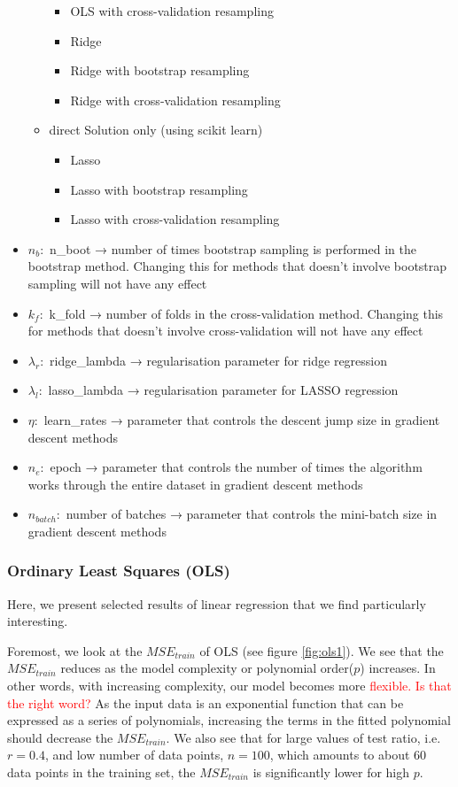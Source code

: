 \begin{itemize}
\begin{itemize}
\begin{itemize}
            \item OLS with cross-validation resampling
            \item Ridge
            \item Ridge with bootstrap resampling
            \item Ridge with cross-validation resampling
        \end{itemize}
        \item direct Solution only (using scikit learn)
        \begin{itemize}
            \item Lasso
            \item Lasso with bootstrap resampling
            \item Lasso with cross-validation resampling
        \end{itemize}
    \end{itemize}
    \item $n_b:$  n\_boot → number of times bootstrap sampling is performed in the bootstrap method. Changing this for methods that doesn't involve bootstrap sampling will not have any effect
    \item $k_f:$  k\_fold → number of folds in the cross-validation method. Changing this for methods that doesn't involve cross-validation will not have any effect
    \item $\lambda_r:$  ridge\_lambda → regularisation parameter for ridge regression
    \item $\lambda_l:$ lasso\_lambda → regularisation parameter for LASSO regression
    \item $\eta:$ learn\_rates → parameter that controls the descent jump size in gradient descent methods
    \item $n_e:$ epoch → parameter that controls the number of times the algorithm works through the entire dataset in gradient descent methods
    \item $n_{batch}:$ number of batches → parameter that controls the mini-batch size in gradient descent methods
\end{itemize}

\subsubsection{Ordinary Least Squares (OLS)}

Here, we present selected results of linear regression that we find particularly interesting.

Foremost, we look at the $MSE_{train}$ of OLS (see figure \ref{fig:ols1}). We see that the $MSE_{train}$ reduces as the model complexity or polynomial order($p$) increases. In other words, with increasing complexity, our model becomes more \textcolor{red}{flexible. Is that the right word?} As the input data is an exponential function that can be expressed as a series of polynomials, increasing the terms in the fitted polynomial should decrease the $MSE_{train}$. We also see that for large values of test ratio, i.e. $r = 0.4$, and low number of data points, $n = 100$, which amounts to about $60$ data points in the training set, the $MSE_{train}$ is significantly lower for high $p$.

